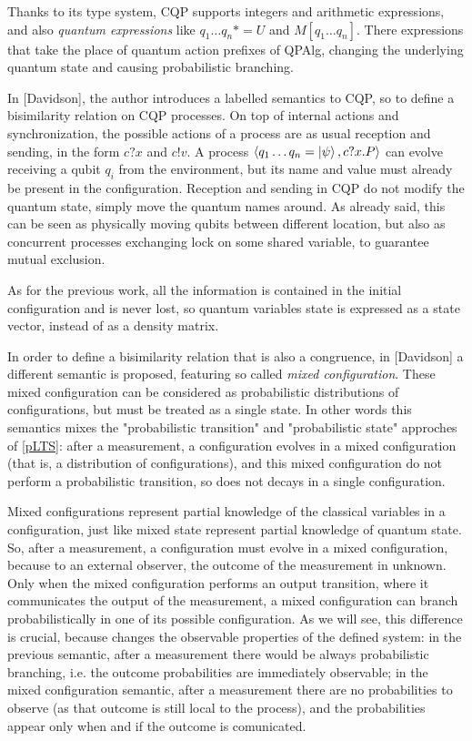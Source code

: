 Thanks to its type system, CQP supports integers and arithmetic expressions, and also \textit{quantum expressions} like $q_1\ldots q_n *= U$ and $M[q_1 \ldots q_n]$. There expressions that take the place of quantum action prefixes of QPAlg, changing the underlying quantum state and causing probabilistic branching.
 

In [Davidson], the author introduces a labelled semantics  to CQP, so to define a bisimilarity relation on CQP processes. On top of internal actions and synchronization, the possible actions of a process are as usual reception and sending, in the form $c?x$ and $c!v$. A process $\langle q_1 \ldots q_n = \ket{\psi}, c?x.P\rangle$ can evolve receiving a qubit $q_i$ from the environment, but its name and value must already be present in the configuration. Reception and sending in CQP do not modify the quantum state, simply move the quantum names around. As already said, this can be seen as physically moving qubits between different location, but also as concurrent processes exchanging lock on some shared variable, to guarantee mutual exclusion.


As for the previous work, all the information is contained in the initial configuration and is never lost, so quantum variables state is expressed as a state vector, instead of as a density matrix.



In order to define a bisimilarity relation that is also a congruence, in [Davidson] a different semantic is proposed, featuring so called \textit{mixed configuration}. These mixed configuration can be considered as probabilistic distributions of configurations, but must be treated as a single state. In other words this semantics mixes the "probabilistic transition" and "probabilistic state" approches of \ref{pLTS}: after a measurement, a configuration evolves in a mixed configuration (that is, a distribution of configurations), and this mixed configuration do not perform a probabilistic transition, so does not decays in a single configuration. 

Mixed configurations represent partial knowledge of the classical variables in a configuration, just like mixed state represent partial knowledge of quantum state. So, after a measurement, a configuration must evolve in a mixed configuration, because to an external observer, the outcome of the measurement in unknown. Only when the mixed configuration performs an output transition, where it communicates the output of the measurement, a mixed configuration can branch probabilistically in one of its possible configuration. As we will see, this difference is crucial, because changes the observable properties of the defined system: in the previous semantic, after a measurement there would be always probabilistic branching, i.e. the outcome probabilities are immediately observable; in the mixed configuration semantic, after a measurement there are no probabilities to observe (as that outcome is still local to the process), and the probabilities appear only when and if the outcome is comunicated.

